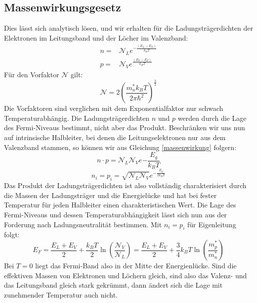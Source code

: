 \documentclass[11pt]{article}
\begin{document}
\subsection{Massenwirkungsgesetz}
Dies lässt sich analytisch lösen, und wir erhalten für die Ladungsträgerdichten
der Elektronen im Leitungsband und der Löcher im Valenzband:
\begin{equation}\label{massenwirkung}
  \begin{align}
    n=&\mathcal{N}_Le^{-\frac{(E_L-E_F)}{k_BT}}\\
    p=&\mathcal{N}_Ve^{\frac{(E_V-E_F)}{k_BT}}
  \end{align}
\end{equation}
Für den Vorfaktor $\mathcal{N}$ gilt:
\begin{equation}
  \mathcal{N}=2\left(\frac{m_n^*k_BT}{2\pi\hbar^2}\right)^{\frac{3}{2}}
\end{equation}
Die Vorfaktoren sind verglichen mit dem Exponentialfaktor nur schwach
Temperaturabhängig.
Die Ladungsträgerdichten $n$ und $p$ werden durch die Lage des Fermi-Niveaus
bestimmt, nicht aber das Produkt. Beschränken wir uns nun auf intrinsische
Halbleiter, bei denen die Leitungselektronen nur aus dem Valenzband stammen, so
können wir aus Gleichung \ref{massenwirkung} folgern:
\begin{equation}
  n\cdot p=\mathcal{N}_L\mathcal{N}_Ve{-\frac{E_g}{k_BT}}
\end{equation}
\begin{equation}
  n_i=p_i=\sqrt{\mathcal{N}_L\mathcal{N}_V}e^{-\frac{E_g}{2k_BT}}
\end{equation}
Das Produkt der Ladungsträgerdichten ist also vollständig charakterisiert durch
die Massen der Ladungsträger und die Energielücke und hat bei fester Temperatur
für jeden Halbleiter einen charakteristischen Wert. Die Lage des Fermi-Niveaus
und dessen Temperaturabhängigkeit lässt sich nun aus der Forderung nach
Ladungsneutralität bestimmen. Mit $n_i=p_i$ für Eigenleitung folgt:
\begin{equation}
  E_F=\frac{E_L+E_V}{2}+\frac{k_BT}{2}\ln(\frac{\mathcal{N}_V}{\mathcal{N}_L})
  =\frac{E_L+E_V}{2}+\frac{3}{4}k_BT\ln(\frac{m^*_p}{m^*_n})
\end{equation}
Bei $T=0$ liegt das Fermi-Band also in der Mitte der Energienlücke. Sind die
effektiven Massen von Elektronen und Löchern gleich, sind also das Valenz- und
das Leitungsband gleich stark gekrümmt, dann ändert sich die Lage mit
zunehmender Temperatur auch nicht.
\end{document}
